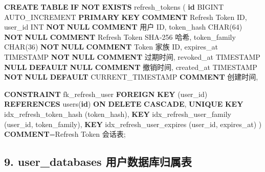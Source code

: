 \documentclass[
  a4paper,
  UTF8]{ctexart}
\newenvironment{Shaded}{}{}
\newcommand{\ControlFlowTok}[1]{\textcolor[rgb]{0.00,0.44,0.13}{\textbf{#1}}}
\newcommand{\DataTypeTok}[1]{\textcolor[rgb]{0.56,0.13,0.00}{#1}}
\newcommand{\DecValTok}[1]{\textcolor[rgb]{0.25,0.63,0.44}{#1}}
\newcommand{\FunctionTok}[1]{\textcolor[rgb]{0.02,0.16,0.49}{#1}}
\newcommand{\KeywordTok}[1]{\textcolor[rgb]{0.00,0.44,0.13}{\textbf{#1}}}
\newcommand{\NormalTok}[1]{#1}
\newcommand{\OperatorTok}[1]{\textcolor[rgb]{0.40,0.40,0.40}{#1}}
\newcommand{\StringTok}[1]{\textcolor[rgb]{0.25,0.44,0.63}{#1}}
\begin{document}
\begin{Shaded}
\begin{Highlighting}[]
\KeywordTok{CREATE} \KeywordTok{TABLE} \ControlFlowTok{IF} \KeywordTok{NOT} \KeywordTok{EXISTS}\NormalTok{ refresh\_tokens (}
  \KeywordTok{id}\NormalTok{ BIGINT AUTO\_INCREMENT }\KeywordTok{PRIMARY} \KeywordTok{KEY} \KeywordTok{COMMENT} \StringTok{\textquotesingle{}Refresh Token ID\textquotesingle{}}\NormalTok{,}
\NormalTok{  user\_id }\DataTypeTok{INT} \KeywordTok{NOT} \KeywordTok{NULL} \KeywordTok{COMMENT} \StringTok{\textquotesingle{}用户 ID\textquotesingle{}}\NormalTok{,}
\NormalTok{  token\_hash }\DataTypeTok{CHAR}\NormalTok{(}\DecValTok{64}\NormalTok{) }\KeywordTok{NOT} \KeywordTok{NULL} \KeywordTok{COMMENT} \StringTok{\textquotesingle{}Refresh Token SHA{-}256 哈希\textquotesingle{}}\NormalTok{,}
\NormalTok{  token\_family }\DataTypeTok{CHAR}\NormalTok{(}\DecValTok{36}\NormalTok{) }\KeywordTok{NOT} \KeywordTok{NULL} \KeywordTok{COMMENT} \StringTok{\textquotesingle{}Token 家族 ID\textquotesingle{}}\NormalTok{,}
\NormalTok{  expires\_at }\DataTypeTok{TIMESTAMP} \KeywordTok{NOT} \KeywordTok{NULL} \KeywordTok{COMMENT} \StringTok{\textquotesingle{}过期时间\textquotesingle{}}\NormalTok{,}
\NormalTok{  revoked\_at }\DataTypeTok{TIMESTAMP} \KeywordTok{NULL} \KeywordTok{DEFAULT} \KeywordTok{NULL} \KeywordTok{COMMENT} \StringTok{\textquotesingle{}撤销时间\textquotesingle{}}\NormalTok{,}
\NormalTok{  created\_at }\DataTypeTok{TIMESTAMP} \KeywordTok{NOT} \KeywordTok{NULL} \KeywordTok{DEFAULT} \FunctionTok{CURRENT\_TIMESTAMP} \KeywordTok{COMMENT} \StringTok{\textquotesingle{}创建时间\textquotesingle{}}\NormalTok{,}

  \KeywordTok{CONSTRAINT}\NormalTok{ fk\_refresh\_user}
    \KeywordTok{FOREIGN} \KeywordTok{KEY}\NormalTok{ (user\_id) }\KeywordTok{REFERENCES}\NormalTok{ users(}\KeywordTok{id}\NormalTok{)}
    \KeywordTok{ON} \KeywordTok{DELETE} \KeywordTok{CASCADE}\NormalTok{,}
  \KeywordTok{UNIQUE} \KeywordTok{KEY}\NormalTok{ idx\_refresh\_token\_hash (token\_hash),}
  \KeywordTok{KEY}\NormalTok{ idx\_refresh\_user\_family (user\_id, token\_family),}
  \KeywordTok{KEY}\NormalTok{ idx\_refresh\_user\_expires (user\_id, expires\_at)}
\NormalTok{) }\KeywordTok{COMMENT}\OperatorTok{=}\StringTok{\textquotesingle{}Refresh Token 会话表\textquotesingle{}}\NormalTok{;}
\end{Highlighting}
\end{Shaded}

\hypertarget{user_databases-ux7528ux6237ux6570ux636eux5e93ux5f52ux5c5eux8868}{%
\subsection{9. user\_databases
用户数据库归属表}\label{user_databases-ux7528ux6237ux6570ux636eux5e93ux5f52ux5c5eux8868}}
\end{document}
